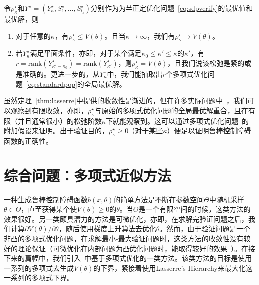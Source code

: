 \begin{theorem}\label{thm:lasserre}
    令$\rho_\kappa^\star$和$Y^\star = \left( Y_\kappa^\star, S_1^\star, \dots, S_{l_s}^\star \right)$分别作为为半正定优化问题~\eqref{eq:sdpverify}的最优值和最优解，则
    \begin{enumerate}
        \item 对于任意的$\kappa$，有$\rho_\kappa^\star \le V(\theta)$。且当$\kappa \rightarrow \infty$，我们有$\rho_\kappa^\star \rightarrow V(\theta)$。
        \item 若$Y_\kappa^\star$满足平面条件，亦即，对于某个满足$\kappa_0 \le \kappa' \le \kappa$的$\kappa'$，有$r = \text{rank}(Y_{\kappa' - \kappa_0}^\star) = \text{rank}(Y_{\kappa'}^\star)$，则$\rho_\kappa^\star = V(\theta)$，且我们说该松弛是紧的或是准确的。更进一步的，从$Y_\kappa^\star$中，我们能抽取出$r$个多项式优化问题~\eqref{eq:standardpop}的全局最优解。
    \end{enumerate}
\end{theorem}

虽然定理~\ref{thm:lasserre}中提供的收敛性是渐进的，但在许多实际问题中~\cite{yang22mp-inexact}，我们可以观察到有限收敛，亦即，$\rho_\kappa^\star$与原始的多项式优化问题的全局最优解重合，且在有限（并且通常很小）的松弛阶数$\kappa$下就能观察到。这可以通过多项式优化问题~\cite{nie14mp-optimality}的附加假设来证明。出于验证目的，$\rho^\star_\kappa \geq 0$（对于某些$\kappa$）便足以证明鲁棒控制障碍函数的正确性。

\section{综合问题：多项式近似方法}
\label{sec:sdpsynthesis}

一种生成鲁棒控制障碍函数$b(x,\theta)$的简单方法是不断在参数空间$\Theta$中随机采样$\theta \in \Theta$，直至获得某个使$V(\theta) \ge 0$的$\theta$。当$\Theta$是一个有限空间的时候，这类方法的效果很好。另一类颇具潜力的方法是可微优化，亦即，在求解完验证问题之后，我们计算$\partial V(\theta) / \partial \theta$，随后使用梯度上升算法去优化$\theta$。然而，由于验证问题是一个非凸的多项式优化问题，在求解最小-最大验证问题时，这类方法的收敛性没有较好的理论保证（可微优化在内部问题为凸优化问题时，能取得较好的效果~\cite{bennett22mp-hierarchical}）。在接下来的篇幅中，我们引入~\cite{lasserre11jgo-minmaxpop}中基于多项式优化的一类方法。该类方法的目标是使用一系列的多项式去生成$V(\theta)$的下界，紧接着使用Lasserre's Hierarchy来最大化这一系列的多项式下界。

